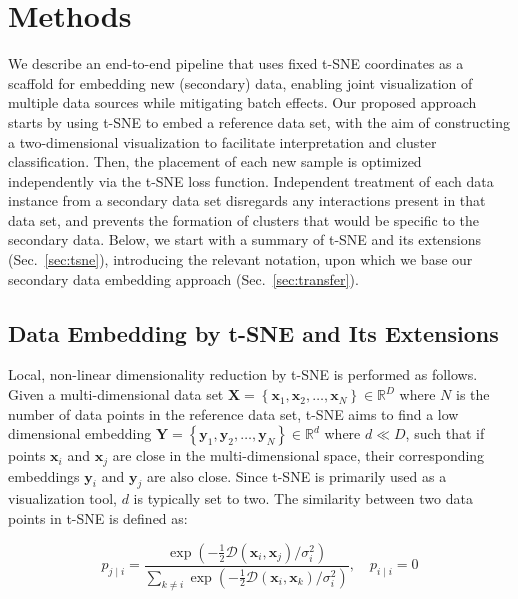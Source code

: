 \documentclass[runningheads]{llncs}
\providecommand{\DIFaddend}{} %
\DeclareRobustCommand{\DIFaddend}{\DIFOaddend \let\includegraphics\DIFOincludegraphics} %
\begin{document}
\DIFaddend \section{Methods}

We describe an end-to-end pipeline that uses fixed t-SNE coordinates as a
scaffold for embedding new (secondary) data, enabling joint visualization of
multiple data sources while mitigating batch effects. Our proposed approach
starts by using t\nobreakdash -SNE to embed a reference data set, with the aim
of constructing a two-dimensional visualization to facilitate interpretation
and cluster classification. Then, the placement of each new sample is optimized
independently via the t\nobreakdash -SNE loss function. Independent treatment
of each data instance from a secondary data set disregards any interactions
present in that data set, and prevents the formation of clusters that would be
specific to the secondary data. Below, we start with a summary of t-SNE and its
extensions (Sec.~\ref{sec:tsne}), introducing the relevant notation, upon which
we base our secondary data embedding approach (Sec.~\ref{sec:transfer}).


\subsection{Data Embedding by t-SNE and Its Extensions\label{sec:tsne}}

Local, non-linear dimensionality reduction by t-SNE is performed as follows.
Given a multi-dimensional data set $\mathbf{X} = \left \{ \mathbf{x}_1,
\mathbf{x}_2, \dots, \mathbf{x}_N \right \} \in \mathbb{R}^D$ where $N$ is the
number of data points in the reference data set, t-SNE aims to find a low
dimensional embedding $\mathbf{Y} = \left \{ \mathbf{y}_1, \mathbf{y}_2, \dots,
\mathbf{y}_N \right \} \in \mathbb{R}^d$ where $d \ll D$, such that if points
$\mathbf{x}_i$ and $\mathbf{x}_j$ are close in the multi-dimensional space,
their corresponding embeddings $\mathbf{y}_i$ and $\mathbf{y}_j$ are also
close. Since t-SNE is primarily used as a visualization tool, $d$ is typically
set to two. The similarity between two data points in t-SNE is defined as:

\begin{equation}
p_{j \mid i} = \frac{\exp \left ( -\frac{1}{2} \mathcal{D}(\mathbf{x}_i, \mathbf{x}_j ) / \sigma_i^2 \right )}{\sum_{k \neq i } \exp \left ( -\frac{1}{2} \mathcal{D}(\mathbf{x}_i, \mathbf{x}_k ) / \sigma_i^2 \right )}, \quad p_{i \mid i} = 0
\label{eq:gaussian_kernel}
\end{equation}
\end{document}
